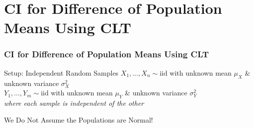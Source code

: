 %
%
%
%
\section{CI for Difference of Population Means Using CLT}
\begin{frame}
\frametitle{CI for Difference of Population Means Using CLT}
\begin{block}{Setup: Independent Random Samples}
$X_1, \hdots, X_n \sim \mbox{iid}$ with unknown mean $\mu_X$ \& unknown variance $\sigma_X^2$\\ $Y_1, \hdots, Y_m \sim \mbox{iid}$ with unknown mean $\mu_Y$ \& unknown variance $\sigma_Y^2$\\
\emph{where each sample is independent of the other } 
\end{block}

\begin{alertblock}{We Do Not Assume the Populations are Normal!}
\end{alertblock}

\end{frame}



